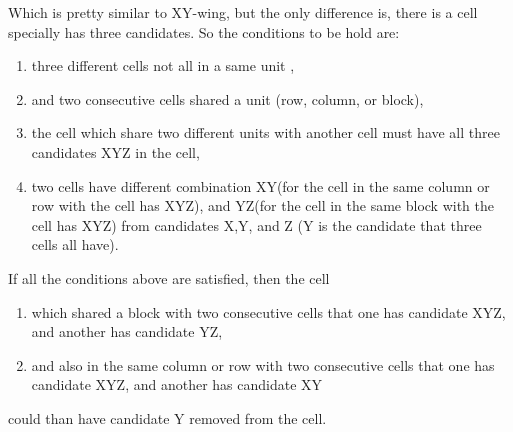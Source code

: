 \documentclass[11pt]{report}
\begin{document}
Which is pretty similar to XY-wing, but the only difference is, there is a cell specially has three candidates. So the conditions to be hold are:
\begin{enumerate}
\item three different cells not all in a same unit ,
\item and two consecutive cells shared a unit (row, column, or block),
\item the cell which share two different units with another cell must have all three candidates XYZ in the cell,
\item two cells have different combination XY(for the cell in the same column or row with the cell has XYZ), and YZ(for the cell in the same block with the cell has XYZ) from candidates  X,Y, and Z (Y is the candidate that three cells all have).
\end{enumerate}
If all the conditions above are satisfied, then the cell
\begin{enumerate}
\item which shared a block with two consecutive cells that one has candidate XYZ, and another has candidate YZ,
\item and also in the same column or row with two consecutive cells that one has candidate XYZ, and another has candidate XY
\end{enumerate}
could than have candidate Y removed from the cell.
\end{document}
